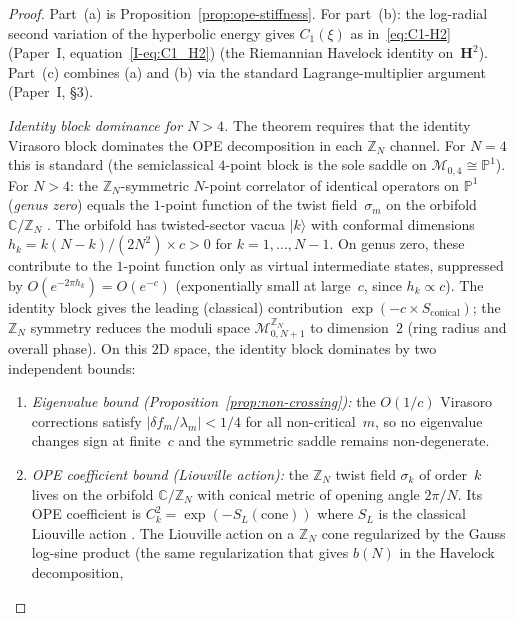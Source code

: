 \begin{proof}
Part~(a) is Proposition~\ref{prop:ope-stiffness}.
For part~(b): the log-radial second variation of the
hyperbolic energy gives $C_1(\xi)$ as in~\eqref{eq:C1-H2}
(Paper~I, equation~\ref*{I-eq:C1_H2})
(the Riemannian Havelock identity on~$\mathbf{H}^2$).
Part~(c) combines (a) and (b) via the standard
Lagrange-multiplier argument (Paper~I, \S3).

\emph{Identity block dominance for $N > 4$.}
The theorem requires that the identity Virasoro block dominates the
OPE decomposition in each $\mathbb{Z}_N$ channel.
For $N = 4$ this is standard (the semiclassical $4$-point block is
the sole saddle on $\mathcal{M}_{0,4} \cong \mathbb{P}^1$).
For $N > 4$: the $\mathbb{Z}_N$-symmetric $N$-point correlator of
identical operators on $\mathbb{P}^1$ (\emph{genus zero})
equals the $1$-point function of the twist field~$\sigma_m$
on the orbifold $\mathbb{C}/\mathbb{Z}_N$
\citep{DixonHarveyVafaWitten1985}.
The orbifold has twisted-sector vacua $|k\rangle$ with
conformal dimensions $h_k = k(N{-}k)/(2N^2) \times c > 0$
for $k = 1, \ldots, N{-}1$.
On genus zero, these contribute to the $1$-point function
only as virtual intermediate states, suppressed by
$O(e^{-2\pi h_k}) = O(e^{-c})$ (exponentially small at
large~$c$, since $h_k \propto c$).
The identity block gives the leading (classical) contribution
$\exp(-c \times S_{\mathrm{conical}})$;
the $\mathbb{Z}_N$ symmetry reduces the moduli space
$\mathcal{M}_{0,N+1}^{\mathbb{Z}_N}$ to dimension~$2$
(ring radius and overall phase).
On this $2$D space, the identity block dominates
by two independent bounds:
\begin{enumerate}
\item \emph{Eigenvalue bound
(Proposition~\ref{prop:non-crossing}):}
  the $O(1/c)$ Virasoro corrections satisfy
  $|\delta f_m/\lambda_m| < 1/4$ for all non-critical~$m$,
  so no eigenvalue changes sign at finite~$c$
  and the symmetric saddle remains non-degenerate.
\item \emph{OPE coefficient bound (Liouville action):}
  the $\mathbb{Z}_N$ twist field $\sigma_k$ of order~$k$
  lives on the orbifold $\mathbb{C}/\mathbb{Z}_N$
  with conical metric of opening angle $2\pi/N$.
  Its OPE coefficient is
  $C_k^2 = \exp(-S_L(\mathrm{cone}))$
  where $S_L$ is the classical Liouville action
  \citep{DixonHarveyVafaWitten1985,Zamolodchikov1987}.
  The Liouville action on a $\mathbb{Z}_N$ cone regularized
  by the Gauss log-sine product (the same regularization
  that gives $b(N)$ in the Havelock decomposition,

\end{enumerate}
\end{proof}
